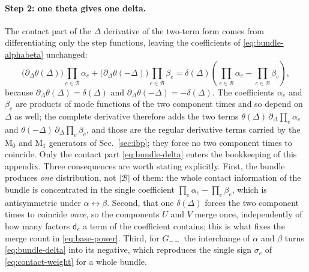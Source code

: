 \documentclass[11pt,a4paper]{article}
\numberwithin{table}{section}
\newcommand{\cB}{\mathcal B}
\begin{document}
\paragraph{Step 2: one theta gives one delta.}
The contact part of the $\Delta$ derivative of the two-term form comes from differentiating only
 the step functions, leaving the coefficients of \eqref{eq:bundle-alphabeta} unchanged:
\begin{equation}
  \big(\partial_\Delta\theta(\Delta)\big)\prod_{e\in\cB}\alpha_e
  +\big(\partial_\Delta\theta(-\Delta)\big)\prod_{e\in\cB}\beta_e
  =\delta(\Delta)\left(\prod_{e\in\cB}\alpha_e-\prod_{e\in\cB}\beta_e\right),
  \label{eq:bundle-delta}
\end{equation}
because $\partial_\Delta\theta(\Delta)=\delta(\Delta)$ and
$\partial_\Delta\theta(-\Delta)=-\delta(\Delta)$. The coefficients $\alpha_e$ and $\beta_e$ are
products of mode functions of the two
component times and so depend on $\Delta$ as well; the complete derivative therefore adds the two terms
$\theta(\Delta)\,\partial_\Delta\prod_e\alpha_e$ and $\theta(-\Delta)\,\partial_\Delta\prod_e\beta_e$,
and those are the regular derivative terms carried by the $\text{M}_0$ and $\text{M}_1$
generators of Sec.~\ref{sec:ibp}; they force no two component times to coincide. Only the contact
part \eqref{eq:bundle-delta} enters the bookkeeping of this appendix.
Three consequences are worth stating explicitly.
First, the bundle produces \emph{one} distribution, not $|\cB|$ of them: the whole contact information
of the bundle is concentrated in the single coefficient
$\prod_e\alpha_e-\prod_e\beta_e$, which is antisymmetric under
$\alpha\leftrightarrow\beta$. Second, that one $\delta(\Delta)$ forces the two component times to
coincide \emph{once}, so the components $U$ and $V$ merge once, independently of how many factors
$\mathsf d_e$ a term of the coefficient contains; this is what fixes the merge count in
\eqref{eq:base-power}. Third, for $G_{--}$ the interchange of $\alpha$ and $\beta$ turns
\eqref{eq:bundle-delta} into its negative, which reproduces the single sign $\sigma_e$ of
\eqref{eq:contact-weight} for a whole bundle.
\end{document}
